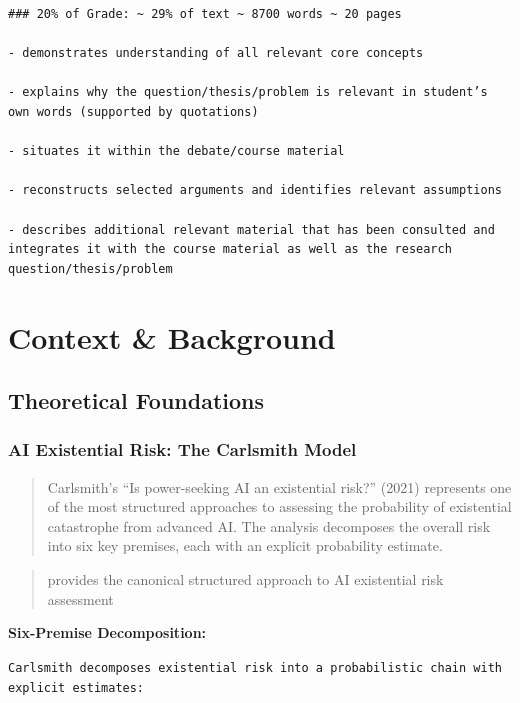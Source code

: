 \documentclass[
  11pt,
  letterpaper,
]{book}
\begin{document}
\begin{verbatim}
### 20% of Grade: ~ 29% of text ~ 8700 words ~ 20 pages

- demonstrates understanding of all relevant core concepts

- explains why the question/thesis/problem is relevant in student’s own words (supported by quotations)

- situates it within the debate/course material

- reconstructs selected arguments and identifies relevant assumptions

- describes additional relevant material that has been consulted and integrates it with the course material as well as the research question/thesis/problem
\end{verbatim}


\chapter{Context \& Background}\label{sec-context}

\section{Theoretical Foundations}\label{sec-theoretical-foundations}

\subsection{AI Existential Risk: The Carlsmith
Model}\label{sec-carlsmith-model}

\begin{quote}
Carlsmith's ``Is power-seeking AI an existential risk?'' (2021)
represents one of the most structured approaches to assessing the
probability of existential catastrophe from advanced AI. The analysis
decomposes the overall risk into six key premises, each with an explicit
probability estimate.
\end{quote}

\begin{quote}
\textcite{carlsmith2021} provides the canonical structured approach to
AI existential risk assessment
\end{quote}

\textbf{Six-Premise Decomposition:}

\texttt{Carlsmith\ decomposes\ existential\ risk\ into\ a\ probabilistic\ chain\ with\ explicit\ estimates:}
\end{document}

